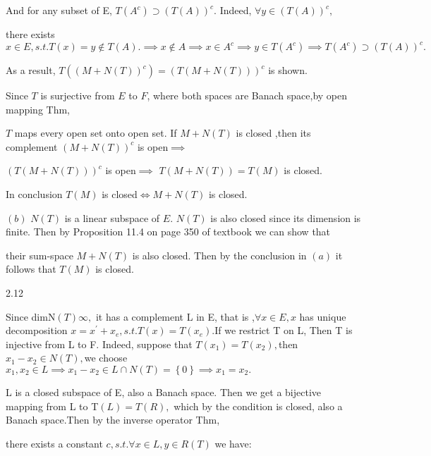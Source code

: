 \documentclass{article}
\begin{document}
And for any subset of E, $T\left( A^{c}\right) \supset \left( T\left(
A\right) \right) ^{c}$. Indeed, $\forall y\in \left( T\left( A\right)
\right) ^{c},$

there exists $x\in E,s.t.T\left( x\right) =y\notin T\left( A\right)
.\implies x\notin A\implies x\in A^{c}\implies y\in T\left( A^{c}\right)
\implies T\left( A^{c}\right) \supset \left( T\left( A\right) \right) ^{c}.$

As a result, $T\left( \left( M+N\left( T\right) \right) ^{c}\right) =\left(
T\left( M+N\left( T\right) \right) \right) ^{c}$ is shown.

Since $T$ is surjective from $E$ to $F$, where both spaces are Banach
space,by open mapping Thm,

$T$ maps every open set onto open set. If $M+N\left( T\right) $ is closed
,then its complement $\left( M+N\left( T\right) \right) ^{c}$ is open$%
\implies $

$\left( T\left( M+N\left( T\right) \right) \right) ^{c}$ is open$\implies $ $%
T\left( M+N\left( T\right) \right) =T\left( M\right) $ is closed.

In conclusion $T\left( M\right) $ is closed$\iff M+N\left( T\right) $ is
closed.

$\left( b\right) $ $N\left( T\right) $ is a linear subspace of $E$. $N\left(
T\right) $ is also closed since its dimension is finite. Then by Proposition
11.4 on page 350 of textbook we can show that

their sum-space $M+N\left( T\right) $ is also closed. Then by the conclusion
in $\left( a\right) $ it follows that $T\left( M\right) $ is closed.

2.12

Since dimN$\left( T\right) $\TEXTsymbol{<}$\infty ,$ it has a complement L
in E, that is ,$\forall x\in E,x$ has unique decomposition $x=x^{\prime
}+x_{e},s.t.T\left( x\right) =T\left( x_{e}\right) .$If we restrict T on L,
Then T is injective from L to F. Indeed, suppose that $T\left( x_{1}\right)
=T\left( x_{2}\right) ,$then $x_{1}-x_{2}\in N\left( T\right) ,$we choose $%
x_{1},x_{2}\in L\implies x_{1}-x_{2}\in L\cap N\left( T\right) =\left\{
0\right\} \implies x_{1}=x_{2}.$

L is a closed subspace of E, also a Banach space. Then we get a bijective
mapping from L to T$\left( L\right) =T\left( R\right) ,$ which by the
condition is closed, also a Banach space$.$Then by the inverse operator Thm,

there exists a constant $c,s.t.\forall x\in L,y\in R\left( T\right) $ we
have:
\end{document}
